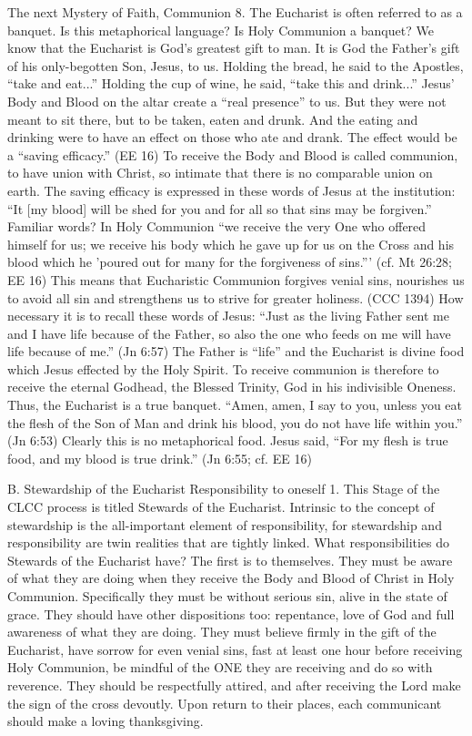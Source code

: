 \documentclass[oneside]{book}
\begin{document}
The next Mystery of Faith, Communion
8. The Eucharist is often referred to as a banquet. Is this metaphorical
language? Is Holy Communion a banquet? We know that the Eucharist is God's
greatest gift to man. It is God the Father's gift of his only-begotten Son,
Jesus, to us. Holding the bread, he said to the Apostles, ``take and eat...''
Holding the cup of wine, he said, ``take this and drink...'' Jesus' Body and
Blood on the altar create a ``real presence'' to us. But they were not meant to
sit there, but to be taken, eaten and drunk. And the eating and drinking were to
have an effect on those who ate and drank. The effect would be a ``saving
efficacy.'' (EE 16)
To receive the Body and Blood is called communion, to have union with Christ, so
intimate that there is no comparable union on earth. The saving efficacy is
expressed in these words of Jesus at the institution: ``It [my blood] will be
shed for you and for all so that sins may be forgiven.'' Familiar words?
In Holy Communion ``we receive the very One who offered himself for us; we
receive his body which he gave up for us on the Cross and his blood which he
'poured out for many for the forgiveness of sins.''' (cf. Mt 26:28; EE 16) This
means that Eucharistic Communion forgives venial sins, nourishes us to avoid all
sin and strengthens us to strive for greater holiness. (CCC 1394) How necessary
it is to recall these words of Jesus: ``Just as the living Father sent me and I
have life because of the Father, so also the one who feeds on me will have life
because of me.'' (Jn 6:57) The Father is ``life'' and the Eucharist is divine
food which Jesus effected by the Holy Spirit. To receive communion is therefore
to receive the eternal Godhead, the Blessed Trinity, God in his indivisible
Oneness. Thus, the Eucharist is a true banquet. ``Amen, amen, I say to you,
unless you eat the flesh of the Son of Man and drink his blood, you do not have
life within you.'' (Jn 6:53) Clearly this is no metaphorical food. Jesus said,
``For my flesh is true food, and my blood is true drink.'' (Jn 6:55; cf. EE 16)

B. Stewardship of the Eucharist
Responsibility to oneself
1. This Stage of the CLCC process is titled Stewards of the Eucharist. Intrinsic
to the concept of stewardship is the all-important element of responsibility,
for stewardship and responsibility are twin realities that are tightly
linked. What responsibilities do Stewards of the Eucharist have? The first is to
themselves. They must be aware of what they are doing when they receive the Body
and Blood of Christ in Holy Communion. Specifically they must be without serious
sin, alive in the state of grace. They should have other dispositions too:
repentance, love of God and full awareness of what they are doing. They must
believe firmly in the gift of the Eucharist, have sorrow for even venial sins,
fast at least one hour before receiving Holy Communion, be mindful of the ONE
they are receiving and do so with reverence. They should be respectfully
attired, and after receiving the Lord make the sign of the cross devoutly. Upon
return to their places, each communicant should make a loving thanksgiving.
\end{document}
